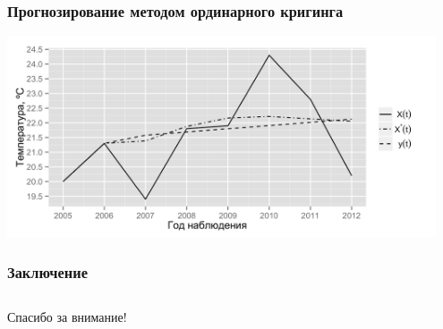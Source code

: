 \documentclass[10pt,pdf,aspectratio=169,hyperref={unicode}]{beamer}
\begin{document}
\begin{frame}
  \frametitle{Прогнозирование методом ординарного кригинга}
  \includegraphics[width=0.95\textwidth]{../../figures/variogram/auto-rob-5-cross-prediction.png}
\end{frame}

\begin{frame}
  \frametitle{Заключение}

\end{frame}

\subsection{}
\begin{frame}
  \frametitle{}
  \begin{center}
    {\Huge Спасибо за внимание!}
  \end{center}
\end{frame}
\end{document}
